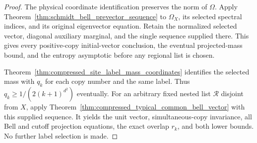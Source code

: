 \begin{proof}
\leanok
{}
The physical coordinate identification preserves the norm of $\Omega$.
Apply Theorem~\ref{thm:schmidt_bell_prevector_sequence} to $\Omega_X$,
its selected spectral indices, and its original eigenvector equation.
Retain the normalized selected vector, diagonal auxiliary marginal, and
the single sequence supplied there. This gives every positive-copy
initial-vector conclusion, the eventual projected-mass bound, and the
entropy asymptotic before any regional list is chosen.

Theorem~\ref{thm:compressed_site_label_mass_coordinates} identifies the
selected mass with $q_k$ for each copy number and the same label. Thus
$q_k\ge1/(2(k+1)^{d^2})$ eventually. For an arbitrary fixed nested list
$\mathcal R$ disjoint from $X$, apply
Theorem~\ref{thm:compressed_typical_common_bell_vector} with this supplied
sequence. It yields the unit vector, simultaneous-copy invariance, all
Bell and cutoff projection equations, the exact overlap $r_k$, and both
lower bounds. No further label selection is made.
\end{proof}
